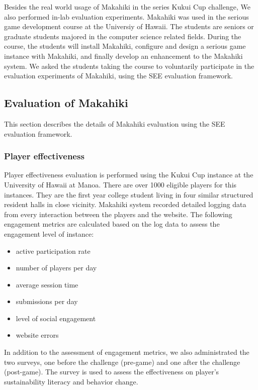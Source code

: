 \documentclass{sigchi}
\begin{document}
Besides the real world usage of Makahiki in the series Kukui Cup challenge, We also performed in-lab evaluation experiments. Makahiki was used in the serious game development course at the Universiy of Hawaii. The students are seniors or graduate students majored in the computer science related fields. During the course, the students will install Makahiki, configure and design a serious game instance with Makahiki, and finally develop an enhancement to the Makahiki system. We asked the students taking the course to voluntarily participate in the evaluation experiments of Makahiki, using the SEE evaluation framework.

\subsection{Evaluation of Makahiki}
This section describes the details of Makahiki evaluation using the SEE evaluation framework.

\subsubsection{Player effectiveness}
Player effectiveness evaluation is performed using the Kukui Cup instance at the University of Hawaii at Manoa. There are over 1000 eligible players for this instances. They are the first year college student living in four similar structured resident halls in close vicinity. Makahiki system recorded detailed logging data from every interaction between the players and the website. The following engagement metrics are calculated based on the log data to assess the engagement level of instance:

\begin{itemize}
\item active participation rate
\item number of players per day
\item average session time
\item submissions per day
\item level of social engagement
\item website errors
\end{itemize}

In addition to the assessment of engagement metrics, we also administrated the two surveys, one before the challenge (pre-game) and one after the challenge (post-game). The survey is used to assess the effectiveness on player's sustainability literacy and behavior change.
\end{document}
